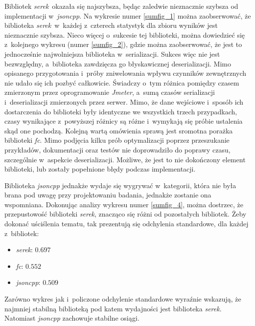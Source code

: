 \documentclass[12pt]{article}
\newcommand{\n}{\newline}
\newcommand{\nonpl}[1]{{\it #1}}
\newcommand{\Jmeter}{\nonpl{Jmeter}\texttrademark}
\newcommand{\serek}{\nonpl{serek}}
\begin{document}
{{{				Bibliotek \serek\  okazała się najszybsza, będąc zaledwie nieznacznie szybsza od implementacji w~\nonpl{jsoncpp}. Na wykresie numer \ref{sumfig_1}
				można zaobserwować, że biblioteka \serek\ w~każdej z~czterech statystyk dla zbioru wyników jest nieznacznie szybsza. Nieco więcej o~sukcesie tej biblioteki,
				można dowiedzieć się z~kolejnego wykresu (numer \ref{sumfig_2}), gdzie można zaobserwować, że jest to jednocześnie najwolniejsza biblioteka w~serializacji.
				Sukces więc nie jest bezwzględny, a~biblioteka zawdzięcza go błyskawicznej deserializacji. Mimo opisanego przygotowania i~próby zniwelowania wpływu
				czynników zewnętrznych nie udało się ich pozbyć całkowicie. Świadczy o~tym różnica pomiędzy czasem zmierzonym przez oprogramowanie \Jmeter, a~sumą czasów
				serializacji i~deserializacji zmierzonych przez serwer. Mimo, że dane wejściowe i~sposób ich dostarczenia do biblioteki były identyczne
				we wszystkich trzech przypadkach, czasy wynikające z~powyższej różnicy są różne i~wymykają się próbie ustalenia skąd one pochodzą. Kolejną wartą omówienia sprawą
				jest sromotna porażka biblioteki \nonpl{fc}. Mimo podjęcia kilku prób optymalizacji poprzez przeszukanie przykładów, dokumentacji
				oraz testów nie doprowadziło do poprawy czasu, szczególnie w~aspekcie deserializacji. Możliwe, że jest to nie dokończony element biblioteki, lub zostały popełnione
				błędy podczas implementacji.\n

				Biblioteka \nonpl{jsoncpp} jednakże wydaje się wygrywać w~kategorii, która nie była brana pod uwagę przy projektowaniu badania, jednakże zostanie
				ona wspomniana. Dokonując analizy wykresu numer \ref{sumfig_4}, można dostrzec, że przepustowość biblioteki \serek, znacząco się różni od pozostałych bibliotek.
				Żeby dokonać uściślenia tematu, tak prezentują się odchylenia standardowe, dla każdej z~bibliotek:

				{
					\begin{itemize}
						\setlength\itemsep{0mm}
						\item \serek: $0.697$
						\item \nonpl{fc}: $0.552$
						\item \nonpl{jsoncpp}: $0.509$
					\end{itemize}
				}

				Zarówno wykres jak i~policzone odchylenie standardowe wyraźnie wskazują, że najmniej stabilną biblioteką pod katem wydajności jest biblioteka \serek.
				Natomiast \nonpl{jsoncpp} zachowuje stabilne osiągi.
			}
		}

}
\end{document}
